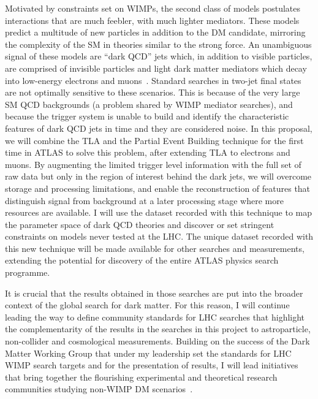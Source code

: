 \documentclass[11pt,a4paper]{article}
\begin{document}
Motivated by constraints set on WIMPs, the second class of models postulates interactions that are much feebler, with much lighter mediators. 
These models~\cite{Strassler:2006im,Cohen:2017pzm} predict a multitude of new particles in addition to the DM candidate, mirroring the complexity of the SM in theories similar to the strong force. 
An unambiguous signal of these models are ``dark QCD'' jets which, in addition to visible particles, are comprised of invisible particles and light dark matter mediators which decay into low-energy electrons and muons~\cite{Curtin:2014cca}. 
Standard searches in two-jet final states are not optimally sensitive to these scenarios. %
This is because of the very large SM QCD backgrounds (a problem shared by WIMP mediator searches), and because the trigger system is unable to build and identify the characteristic features of dark QCD jets in time and they are considered noise. 
In this proposal, we will combine the TLA and the Partial Event Building technique for the first time in ATLAS to solve this problem, after extending TLA to electrons and muons. %
By augmenting the limited trigger level information with the full set of raw data but only in the region of interest behind the dark jets, we will overcome storage and processing limitations, and enable the reconstruction of features that distinguish signal from background at a later processing stage where more resources are available. 
I will use the dataset recorded with this technique to map the parameter space of dark QCD theories and discover or set stringent constraints on models never tested at the LHC. 
The unique dataset recorded with this new technique will be made available for other searches and measurements, extending the potential for discovery of the entire ATLAS physics search programme. 

It is crucial that the results obtained in those searches are put into the broader context of the global search for dark matter. 
For this reason, I will continue leading the way to define community standards for LHC searches that highlight the complementarity of the results in the searches in this project to astroparticle, non-collider and cosmological measurements. 
Building on the success of the Dark Matter Working Group that under my leadership set the standards for LHC WIMP search targets and for the presentation of results, I will lead initiatives that bring together the flourishing experimental and theoretical research communities studying non-WIMP DM scenarios~\cite{iDMEu}. 
\end{document}
